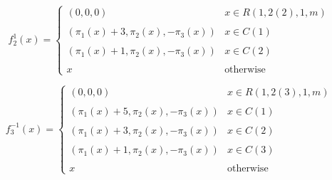 \documentclass[a4paper, 10pt]{article}
\begin{document}
	$$f_2^{1}(x)=\left \{ \begin{array}{ll}
		(0,0,0) & x\in R(1,2(2),1,m)\\
		\\
		(\pi_1(x)+3,\pi_2(x),-\pi_3(x)) & x\in C(1)\\
		\\
		(\pi_1(x)+1,\pi_2(x),-\pi_3(x)) & x\in C(2)\\
		\\
		x & \mbox{otherwise}
	\end{array}  \right .$$

	$$f_3^{-1}(x)=\left \{ \begin{array}{ll}
		(0,0,0) & x\in R(1,2(3),1,m)\\
		\\
		(\pi_1(x)+5,\pi_2(x),-\pi_3(x)) & x\in C(1)\\
		\\
		(\pi_1(x)+3,\pi_2(x),-\pi_3(x)) & x\in C(2)\\
		\\
		(\pi_1(x)+1,\pi_2(x),-\pi_3(x)) & x\in C(3)\\
		\\
		x & \mbox{otherwise}
	\end{array}  \right .$$
		
	
	
	
	
	
\end{document}

